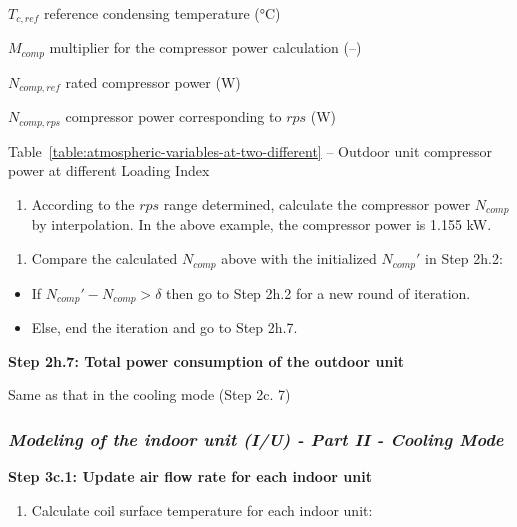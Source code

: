 \(T_{c,ref}\) reference condensing temperature (°C)

\(M_{comp}\) multiplier for the compressor power calculation (--)

\(N_{comp,ref}\) rated compressor power (W)

\(N_{comp,rps}\) compressor power corresponding to \(rps\) (W)

Table~\ref{table:atmospheric-variables-at-two-different} -- Outdoor unit compressor power at different Loading Index

\begin{enumerate}
\def\labelenumi{\alph{enumi}.}
\setcounter{enumi}{1}
\tightlist
\item
  According to the \(rps\) range determined, calculate the compressor power \(N_{comp}\) by interpolation. In the above example, the compressor power is 1.155 kW. 
\end{enumerate}

\begin{enumerate}
\def\labelenumi{(\arabic{enumi})}
\setcounter{enumi}{1}
\tightlist
\item
  Compare the calculated \(N_{comp}\) above with the initialized \({N_{comp}}'\) in Step 2h.2:
\end{enumerate}

\begin{itemize}
\item
  If \({N_{comp}}'-N_{comp}>\delta\) then go to Step 2h.2 for a new round of iteration.
\item
  Else, end the iteration and go to Step 2h.7.
\end{itemize}

\textbf{Step 2h.7: Total power consumption of the outdoor unit}

Same as that in the cooling mode (Step 2c. 7)

\subsubsection{\emph{Modeling of the indoor unit (I/U) - Part II - Cooling Mode}}\label{modeling-of-the-indoor-unit-iu---part-ii---cooling-mode}

\textbf{Step 3c.1: Update air flow rate for each indoor unit}

\begin{enumerate}
\def\labelenumi{(\arabic{enumi})}
\tightlist
\item
  Calculate coil surface temperature for each indoor unit:
\end{enumerate}

